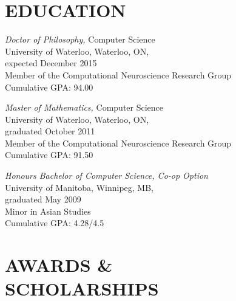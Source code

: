 \documentclass[line,margin]{res}
\begin{document}

\begin{resume}

\section{EDUCATION}

{\sl Doctor of Philosophy,} Computer Science \\
University of Waterloo, Waterloo, ON, \\
expected December 2015 \\
Member of the Computational Neuroscience Research Group \\
Cumulative GPA: 94.00

{\sl Master of Mathematics,} Computer Science \\
University of Waterloo, Waterloo, ON, \\
graduated October 2011 \\
Member of the Computational Neuroscience Research Group \\
Cumulative GPA: 91.50

{\sl Honours Bachelor of Computer Science, Co-op Option} \\
University of Manitoba, Winnipeg, MB, \\
graduated May 2009 \\
Minor in Asian Studies \\
Cumulative GPA: 4.28/4.5

\section{AWARDS \& \\ SCHOLARSHIPS}


\end{resume}
\end{document}
